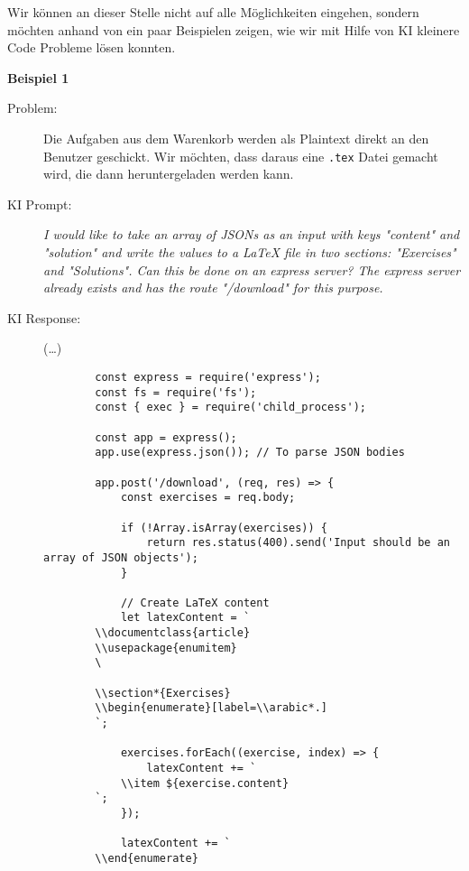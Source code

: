 Wir können an dieser Stelle nicht auf alle Möglichkeiten eingehen, sondern möchten anhand von ein paar Beispielen zeigen, wie wir mit Hilfe von KI kleinere Code Probleme lösen konnten.

\textbf{Beispiel 1} 
\begin{description}
    \item[Problem:] Die Aufgaben aus dem Warenkorb werden als Plaintext direkt an den Benutzer geschickt. Wir möchten, dass daraus eine \texttt{.tex} Datei gemacht wird, die dann heruntergeladen werden kann.
    \item[KI Prompt:] \emph{I would like to take an array of JSONs as an input with keys "content" and "solution" and write the values to a LaTeX file in two sections: "Exercises" and "Solutions". Can this be done on an express server? The express server already exists and has the route "/download" for this purpose.}
    \newpage
    \item[KI Response:] (\ldots)

    \begin{lstlisting}
        const express = require('express');
        const fs = require('fs');
        const { exec } = require('child_process');
        
        const app = express();
        app.use(express.json()); // To parse JSON bodies
        
        app.post('/download', (req, res) => {
            const exercises = req.body;
        
            if (!Array.isArray(exercises)) {
                return res.status(400).send('Input should be an array of JSON objects');
            }
        
            // Create LaTeX content
            let latexContent = `
        \\documentclass{article}
        \\usepackage{enumitem}
        \
        
        \\section*{Exercises}
        \\begin{enumerate}[label=\\arabic*.]
        `;
        
            exercises.forEach((exercise, index) => {
                latexContent += `
            \\item ${exercise.content}
        `;
            });
        
            latexContent += `
        \\end{enumerate}
        

\end{lstlisting}
\end{description}
